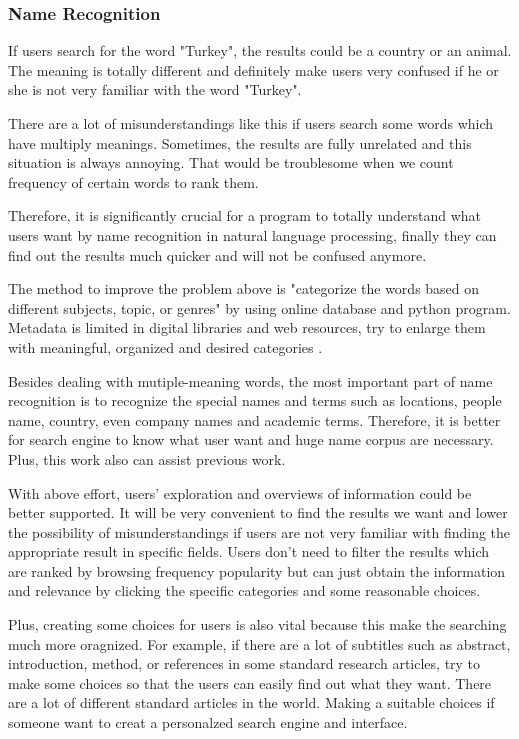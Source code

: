 \subsubsection*{Name Recognition}

If users search for the word "Turkey", the results could be a country or an animal. 
The meaning is totally different and definitely make users very confused if he or she is not very familiar with the word "Turkey". 

There are a lot of misunderstandings like this if users search some words which have multiply meanings. 
Sometimes, the results are fully unrelated and this situation is always annoying. 
That would be troublesome when we count frequency of certain words to rank them.

Therefore, it is significantly crucial for a program to totally understand what users want by name recognition in natural language processing, finally they can find out the results much quicker and will not be confused anymore.

The method to improve the problem above is "categorize the words based on different subjects, topic, or genres" by using online database and python program. 
Metadata is limited in digital libraries and web resources, try to enlarge them with meaningful, organized and desired
categories \cite{Kules2006}.

Besides dealing with mutiple-meaning words, the most important part of name recognition is to recognize the special names and terms such as locations, people name, country, even company names and academic terms.
Therefore, it is better for search engine to know what user want and huge name corpus are necessary. 
Plus, this work also can assist previous work.

With above effort, users' exploration and overviews of information could be better supported. It will be very convenient to find the results we want and lower the possibility of misunderstandings if users are not very familiar with finding the appropriate result in specific fields.
\cite{TunThuraThet2010} Users don't need to filter the results which are ranked by browsing frequency popularity but can just obtain the information and relevance by clicking the specific categories and some reasonable choices.

Plus, creating some choices for users is also vital because this make the searching much more oragnized. 
For example, if there are a lot of subtitles such as abstract, introduction, method, or references in some standard research articles, try to make some choices so that the users can easily find out what they want. 
There are a lot of different standard articles in the world.
 Making a suitable choices if someone want to creat a personalzed search engine and interface. 

